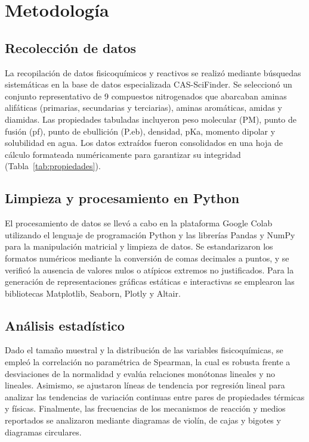 %

\section{Metodología}
\fontsize{12}{14}\selectfont

\subsection{Recolección de datos}
La recopilación de datos fisicoquímicos y reactivos se realizó mediante búsquedas
sistemáticas en la base de datos especializada CAS-SciFinder. Se seleccionó un
conjunto representativo de 9 compuestos nitrogenados que abarcaban aminas
alifáticas (primarias, secundarias y terciarias), aminas aromáticas, amidas y
diamidas. Las propiedades tabuladas incluyeron peso molecular (PM), punto de
fusión (pf), punto de ebullición (P.eb), densidad, pKa, momento dipolar y
solubilidad en agua. Los datos extraídos fueron consolidados en una hoja de cálculo
formateada numéricamente para garantizar su integridad
(Tabla~\ref{tab:propiedades}).

\subsection{Limpieza y procesamiento en Python}
El procesamiento de datos se llevó a cabo en la plataforma Google Colab utilizando
el lenguaje de programación Python y las librerías Pandas y NumPy para la
manipulación matricial y limpieza de datos. Se estandarizaron los formatos
numéricos mediante la conversión de comas decimales a puntos, y se verificó la
ausencia de valores nulos o atípicos extremos no justificados. Para la generación
de representaciones gráficas estáticas e interactivas se emplearon las bibliotecas
Matplotlib, Seaborn, Plotly y Altair.

\subsection{Análisis estadístico}
Dado el tamaño muestral y la distribución de las variables fisicoquímicas, se
empleó la correlación no paramétrica de Spearman, la cual es robusta frente a
desviaciones de la normalidad y evalúa relaciones monótonas lineales y no
lineales. Asimismo, se ajustaron líneas de tendencia por regresión lineal para
analizar las tendencias de variación continuas entre pares de propiedades térmicas
y físicas. Finalmente, las frecuencias de los mecanismos de reacción y medios
reportados se analizaron mediante diagramas de violín, de cajas y bigotes y
diagramas circulares.

